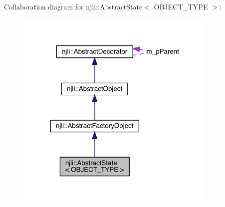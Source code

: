 Collaboration diagram for njli\+:\+:Abstract\+State$<$ O\+B\+J\+E\+C\+T\+\_\+\+T\+Y\+PE $>$\+:\nopagebreak
\begin{figure}[H]
\begin{center}
\leavevmode
\includegraphics[width=273pt]{classnjli_1_1_abstract_state__coll__graph}
\end{center}
\end{figure}
